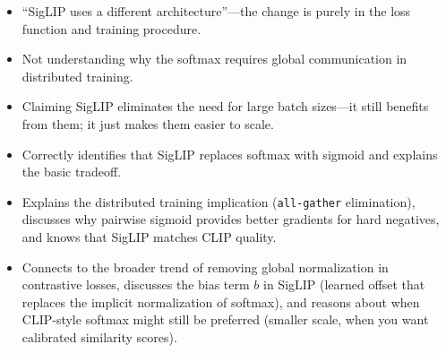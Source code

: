 \begin{interviewq}
\redflags
\begin{itemize}
    \item ``SigLIP uses a different architecture''---the change is purely in the loss function and training procedure.
    \item Not understanding why the softmax requires global communication in distributed training.
    \item Claiming SigLIP eliminates the need for large batch sizes---it still benefits from them; it just makes them easier to scale.
\end{itemize}


\goodgreat
\begin{itemize}
    \item {} Correctly identifies that SigLIP replaces softmax with sigmoid and explains the basic tradeoff.
    \item {} Explains the distributed training implication (\texttt{all-gather} elimination), discusses why pairwise sigmoid provides better gradients for hard negatives, and knows that SigLIP matches CLIP quality.
    \item {} Connects to the broader trend of removing global normalization in contrastive losses, discusses the bias term $b$ in SigLIP (learned offset that replaces the implicit normalization of softmax), and reasons about when CLIP-style softmax might still be preferred (smaller scale, when you want calibrated similarity scores).
\end{itemize}

\end{interviewq}


